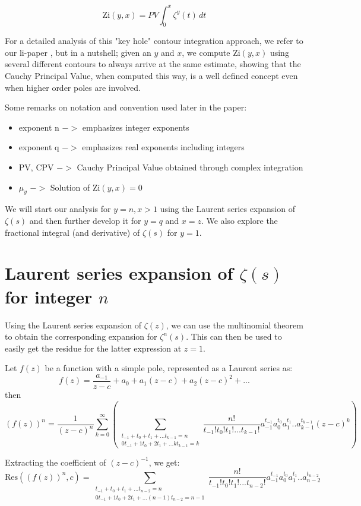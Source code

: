 \documentclass[a4paper,11pt,twoside]{amsart}
\newcommand\li{\mathrm{li}}
\newcommand\Zi{\mathrm{Zi}}
\newcommand\Res{\mathrm{Res}}
\begin{document}
\begin{equation}\label{zi1}
 \Zi(y,x) = PV \int_0^x {\zeta^{y}(t)} \,dt
\end{equation}


For a detailed analysis of this "key hole" contour integration approach, we refer to our $\li$-paper \cite{mudw}, but in a nutshell; given an $y$ and $x$, we compute $\Zi(y,x)$ using several different contours to always arrive at the same estimate, showing that the Cauchy Principal Value, when computed this way, is a well defined concept even when higher order poles are involved. 
  
Some remarks on notation and convention used later in the paper:
\begin{itemize}
 \item exponent n $->$ emphasizes integer exponents
 \item exponent q $->$ emphasizes real exponents including integers
 \item PV, CPV $->$ Cauchy Principal Value obtained through complex integration 
 \item $\mu_y$ $->$ Solution of $\Zi(y,x)=0$
\end{itemize}

We will start our analysis for $y = n, x > 1$ using the Laurent series expansion of $\zeta(s)$ and then further develop it for $y = q$ and $x = z$. We also explore the fractional integral (and derivative) of $\zeta(s)$ for $y=1$.

\section{Laurent series expansion of $\zeta(s)$ for integer $n$}

Using the Laurent series expansion of $\zeta(z)$, we can use the multinomial theorem to obtain the corresponding expansion for $\zeta^{n}(s)$. This can then be used to easily get the residue for the latter expression at $z=1$.

Let $f(z)$ be a function with a simple pole, represented as a Laurent series as: $$f(z) = \frac{a_{-1}}{z-c} + a_0 + a_1 (z-c) + a_2 (z-c)^2 + ...$$
then $$(f(z))^n = \frac{1}{(z-c)^n} \sum\limits_{k=0}^{\infty}\left(\sum\limits_{\substack{t_{-1} + t_0 + t_1 + ... t_{k-1} = n \\ 0t_{-1} + 1t_0 + 2t_1 + ... kt_{k-1} = k}} \frac{n!}{t_{-1}!t_{0}!t_{1}!...t_{k-1}!} a_{-1}^{t_{-1}} a_{0}^{t_0}a_{1}^{t_1}..a_{k-1}^{t_{k-1}} (z-c)^k\right)$$

Extracting the coefficient of $(z-c)^{-1}$, we get:
$$\Res((f(z))^n,c) =  
\sum\limits_{\substack{t_{-1} + t_0 + t_1 + ... t_{n-2} = n \\ 0t_{-1} + 1t_0 + 2t_1 + ... (n-1)t_{n-2} = n-1}} \frac{n!}{t_{-1}!t_{0}!t_{1}!...t_{n-2}!} a_{-1}^{t_{-1}} a_{0}^{t_0}a_{1}^{t_1}..a_{n-2}^{t_{n-2}}$$
 
\end{document}
